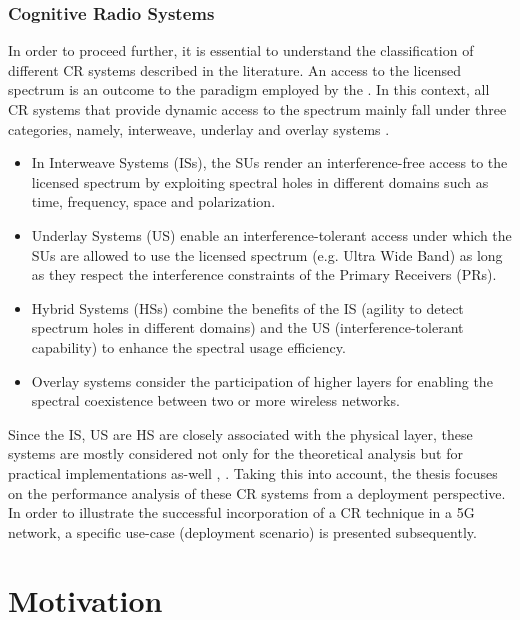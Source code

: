 \subsubsection*{Cognitive Radio Systems}
In order to proceed further, it is essential to understand the classification of different CR systems described in the literature. An access to the licensed spectrum is an outcome to the paradigm employed by the . In this context, all CR systems that provide dynamic access to the spectrum mainly fall under three categories, namely, interweave, underlay and overlay systems \cite{Goldsmith09}. 
\begin{itemize}
\item In Interweave Systems (ISs), the SUs render an interference-free access to the licensed spectrum by exploiting spectral holes in different domains such as time, frequency, space and polarization. 
\item Underlay Systems (US) enable an interference-tolerant access under which the SUs are allowed to use the licensed spectrum (e.g. Ultra Wide Band) as long as they respect the interference constraints of the Primary Receivers (PRs). 
\item Hybrid Systems (HSs) combine the benefits of the IS (agility to detect spectrum holes in different domains) and the US (interference-tolerant capability) to enhance the spectral usage efficiency.  
\item Overlay systems consider the participation of higher layers for enabling the spectral coexistence between two or more wireless networks. 
\end{itemize}
Since the IS, US are HS are closely associated with the physical layer, these systems are mostly considered not only for the theoretical analysis but for practical implementations as-well , \cite{Cabric06, Kim10}. Taking this into account, the thesis focuses on the performance analysis of these CR systems from a deployment perspective. In order to illustrate the successful incorporation of a CR technique in a 5G network, a specific use-case (deployment scenario) is presented subsequently. 


\section{Motivation}
\label{sec:mot}


